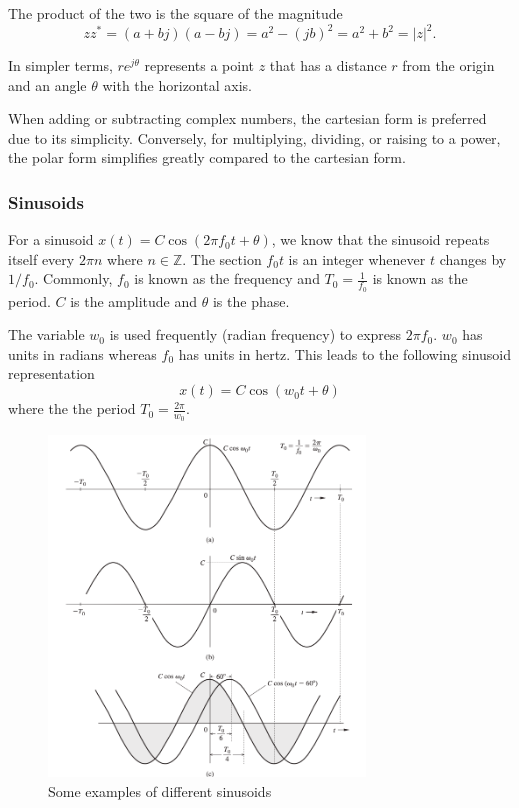 The product of the two is the square of the magnitude
\begin{equation}
    zz^* = (a+bj)(a-bj) = a^2 -(jb)^2 = a^2 + b^2 = |z|^2.
\end{equation}

In simpler terms, $re^{j\theta}$ represents a point $z$ that has a distance $r$ from the origin and an angle $\theta$ with the horizontal axis.

When adding or subtracting complex numbers, the cartesian form is preferred due to its simplicity.
Conversely, for multiplying, dividing, or raising to a power, the polar form simplifies greatly compared to the cartesian form.

\subsubsection{Sinusoids}
For a sinusoid $x(t) = C \cos (2\pi f_0 t + \theta)$, we know that the sinusoid repeats itself every $2\pi n$ where $n \in \mathbb{Z}$.
The section $f_0 t$ is an integer whenever $t$ changes by $1/f_0$.
Commonly, $f_0$ is known as the frequency and $T_0 = \frac{1}{f_0}$ is known as the period.
$C$ is the amplitude and $\theta$ is the phase.

The variable $w_0$ is used frequently (radian frequency) to express $2\pi f_0$.
$w_0$ has units in radians whereas $f_0$ has units in hertz.
This leads to the following sinusoid representation
\begin{equation}
    x(t) = C \cos (w_0 t + \theta)
\end{equation}
where the the period $T_0 = \frac{2 \pi}{w_0}$.

\begin{figure}[htbp]
  \centerline{\includegraphics[width=0.75\textwidth]{../../images/example_sinusoids.png}}
  \caption{Some examples of different sinusoids}
  \label{fig:example_sinusoids}
\end{figure}

